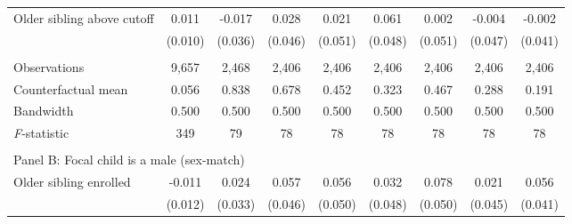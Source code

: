 \begin{table}[!htbp]
{{\begin{tabular}{lcccccccc}
Older sibling above cutoff&       0.011   &      -0.017   &       0.028   &       0.021   &       0.061   &       0.002   &      -0.004   &      -0.002   \\
                    &     (0.010)   &     (0.036)   &     (0.046)   &     (0.051)   &     (0.048)   &     (0.051)   &     (0.047)   &     (0.041)   \\
                    &               &               &               &               &               &               &               &               \\
Observations        &       9,657   &       2,468   &       2,406   &       2,406   &       2,406   &       2,406   &       2,406   &       2,406   \\
Counterfactual mean &       0.056   &       0.838   &       0.678   &       0.452   &       0.323   &       0.467   &       0.288   &       0.191   \\
Bandwidth           &       0.500   &       0.500   &       0.500   &       0.500   &       0.500   &       0.500   &       0.500   &       0.500   \\
\textit{F}-statistic&         349   &          79   &          78   &          78   &          78   &          78   &          78   &          78   \\
 
&  &  &  &  \\
\multicolumn{10}{l}{Panel B: Focal child is a male (sex-match)} \\
Older sibling enrolled&      -0.011   &       0.024   &       0.057   &       0.056   &       0.032   &       0.078   &       0.021   &       0.056   \\
                    &     (0.012)   &     (0.033)   &     (0.046)   &     (0.050)   &     (0.048)   &     (0.050)   &     (0.045)   &     (0.041)   \\
 

\end{tabular}}}
\end{table}
